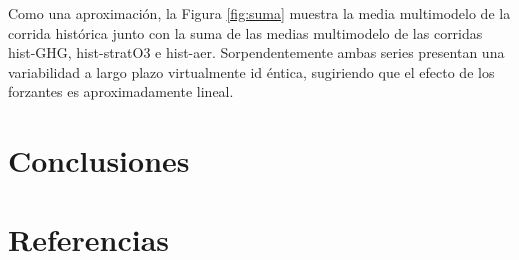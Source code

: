 \documentclass[12pt,oneside]{reedthesis}
\begin{document}
Como una aproximación, la Figura \ref{fig:suma} muestra la media multimodelo de la corrida histórica junto con la suma de las medias multimodelo de las corridas hist-GHG, hist-stratO3 e hist-aer.
Sorpendentemente ambas series presentan una variabilidad a largo plazo virtualmente id éntica, sugiriendo que el efecto de los forzantes es aproximadamente lineal.

\hypertarget{conclusiones}{%
\section{Conclusiones}\label{conclusiones}}

\backmatter

\hypertarget{referencias}{%
\section*{Referencias}\label{referencias}}


\noindent

\setlength{\parindent}{-0.20in}
\end{document}
